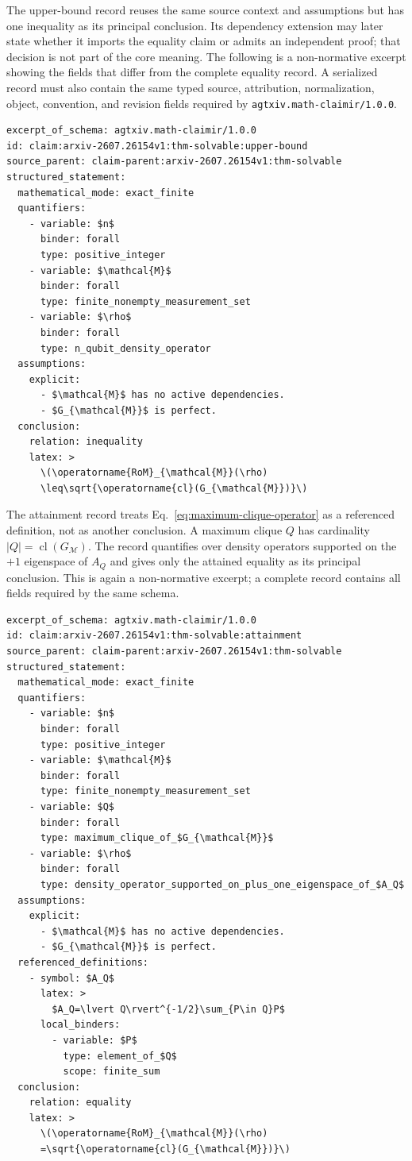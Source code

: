 The upper-bound record reuses the same source context and assumptions but has one inequality as its principal conclusion. Its dependency extension may later state whether it imports the equality claim or admits an independent proof; that decision is not part of the core meaning. The following is a non-normative excerpt showing the fields that differ from the complete equality record. A serialized record must also contain the same typed source, attribution, normalization, object, convention, and revision fields required by \texttt{agtxiv.math-claimir/1.0.0}.

\begin{verbatim}
excerpt_of_schema: agtxiv.math-claimir/1.0.0
id: claim:arxiv-2607.26154v1:thm-solvable:upper-bound
source_parent: claim-parent:arxiv-2607.26154v1:thm-solvable
structured_statement:
  mathematical_mode: exact_finite
  quantifiers:
    - variable: $n$
      binder: forall
      type: positive_integer
    - variable: $\mathcal{M}$
      binder: forall
      type: finite_nonempty_measurement_set
    - variable: $\rho$
      binder: forall
      type: n_qubit_density_operator
  assumptions:
    explicit:
      - $\mathcal{M}$ has no active dependencies.
      - $G_{\mathcal{M}}$ is perfect.
  conclusion:
    relation: inequality
    latex: >
      \(\operatorname{RoM}_{\mathcal{M}}(\rho)
      \leq\sqrt{\operatorname{cl}(G_{\mathcal{M}})}\)
\end{verbatim}

The attainment record treats Eq.~\ref{eq:maximum-clique-operator} as a referenced definition, not as another conclusion. A maximum clique $Q$ has cardinality $\lvert Q\rvert=\operatorname{cl}(G_{\mathcal{M}})$. The record quantifies over density operators supported on the $+1$ eigenspace of $A_Q$ and gives only the attained equality as its principal conclusion. This is again a non-normative excerpt; a complete record contains all fields required by the same schema.

\begin{verbatim}
excerpt_of_schema: agtxiv.math-claimir/1.0.0
id: claim:arxiv-2607.26154v1:thm-solvable:attainment
source_parent: claim-parent:arxiv-2607.26154v1:thm-solvable
structured_statement:
  mathematical_mode: exact_finite
  quantifiers:
    - variable: $n$
      binder: forall
      type: positive_integer
    - variable: $\mathcal{M}$
      binder: forall
      type: finite_nonempty_measurement_set
    - variable: $Q$
      binder: forall
      type: maximum_clique_of_$G_{\mathcal{M}}$
    - variable: $\rho$
      binder: forall
      type: density_operator_supported_on_plus_one_eigenspace_of_$A_Q$
  assumptions:
    explicit:
      - $\mathcal{M}$ has no active dependencies.
      - $G_{\mathcal{M}}$ is perfect.
  referenced_definitions:
    - symbol: $A_Q$
      latex: >
        $A_Q=\lvert Q\rvert^{-1/2}\sum_{P\in Q}P$
      local_binders:
        - variable: $P$
          type: element_of_$Q$
          scope: finite_sum
  conclusion:
    relation: equality
    latex: >
      \(\operatorname{RoM}_{\mathcal{M}}(\rho)
      =\sqrt{\operatorname{cl}(G_{\mathcal{M}})}\)
\end{verbatim}

